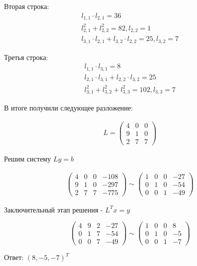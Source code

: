 \documentclass[a4paper,12pt]{report} %
\begin{document}
Вторая строка:
\begin{gather*}
	l_{1,1} \cdot l_{2,1} = 36 \\
	l_{2,1}^2 + l_{2,2}^2 = 82, l_{2,2} = 1 \\
	l_{3,1} \cdot l_{2,1} + l_{3,2} \cdot l_{2,2} = 25, l_{3,2} = 7
\end{gather*}

Третья строка:
\begin{gather*}
	l_{1,1} \cdot l_{3,1} = 8 \\
	l_{2,1} \cdot l_{3,1} + l_{2,2} \cdot l_{3,2} = 25 \\
	l_{3,1}^2 + l_{3,2}^2 + l_{3,3}^2 = 102, l_{3,3} = 7
\end{gather*}

В итоге получили следующее разложение:

\begin{gather*}
	L = 
	\begin{pmatrix}
		4 & 0 & 0 \\
		9 & 1 & 0 \\
		2 & 7 & 7
	\end{pmatrix}
\end{gather*}

Решим систему $Ly = b$

\begin{gather*}
	\begin{pmatrix}
		4 & 0 & 0 & -108 \\
		9 & 1 & 0 & -297 \\
		2 & 7 & 7 & -775
	\end{pmatrix} \sim 
	\begin{pmatrix}
		1 & 0 & 0 & -27 \\
		0 & 1 & 0 & -54 \\
		0 & 0 & 1 & -49
	\end{pmatrix}
\end{gather*}

Заключительный этап решения - $L^Tx = y$

\[
	\begin{pmatrix}
		4 & 9 & 2 & -27 \\
		0 & 1 & 7 & -54 \\
		0 & 0 & 7 & -49
	\end{pmatrix} \sim
	\begin{pmatrix}
		1 & 0 & 0 & 8 \\
		0 & 1 & 0 & -5 \\
		0 & 0 & 1 & -7
	\end{pmatrix}
\]

Ответ: $(8, -5, -7)^T$
\end{document}
